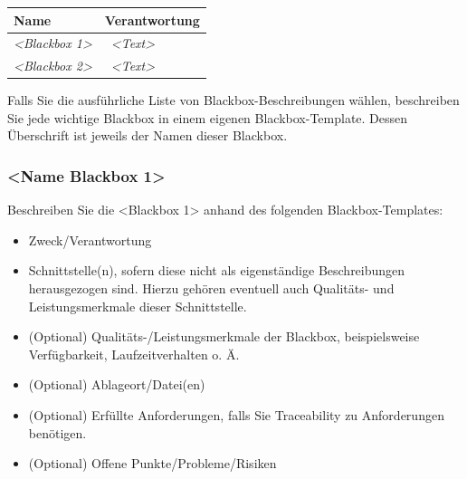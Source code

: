 \documentclass[]{article}
\begin{document}
\begin{longtable}[]{@{}ll@{}}
\toprule
\begin{minipage}[b]{0.31\columnwidth}\raggedright
\textbf{Name}\strut
\end{minipage} & \begin{minipage}[b]{0.63\columnwidth}\raggedright
\textbf{Verantwortung}\strut
\end{minipage}\tabularnewline
\midrule
\endhead
\begin{minipage}[t]{0.31\columnwidth}\raggedright
\emph{\textless{}Blackbox 1\textgreater{}}\strut
\end{minipage} & \begin{minipage}[t]{0.63\columnwidth}\raggedright
~\emph{\textless{}Text\textgreater{}}\strut
\end{minipage}\tabularnewline
\begin{minipage}[t]{0.31\columnwidth}\raggedright
\emph{\textless{}Blackbox 2\textgreater{}}\strut
\end{minipage} & \begin{minipage}[t]{0.63\columnwidth}\raggedright
~\emph{\textless{}Text\textgreater{}}\strut
\end{minipage}\tabularnewline
\bottomrule
\end{longtable}

Falls Sie die ausführliche Liste von Blackbox-Beschreibungen wählen,
beschreiben Sie jede wichtige Blackbox in einem eigenen
Blackbox-Template. Dessen Überschrift ist jeweils der Namen dieser
Blackbox.

\hypertarget{__name_blackbox_1}{%
\subsubsection{\textless{}Name Blackbox
1\textgreater{}}\label{__name_blackbox_1}}

Beschreiben Sie die \textless{}Blackbox 1\textgreater{} anhand des
folgenden Blackbox-Templates:

\begin{itemize}
\item
  Zweck/Verantwortung
\item
  Schnittstelle(n), sofern diese nicht als eigenständige Beschreibungen
  herausgezogen sind. Hierzu gehören eventuell auch Qualitäts- und
  Leistungsmerkmale dieser Schnittstelle.
\item
  (Optional) Qualitäts-/Leistungsmerkmale der Blackbox, beispielsweise
  Verfügbarkeit, Laufzeitverhalten o. Ä.
\item
  (Optional) Ablageort/Datei(en)
\item
  (Optional) Erfüllte Anforderungen, falls Sie Traceability zu
  Anforderungen benötigen.
\item
  (Optional) Offene Punkte/Probleme/Risiken
\end{itemize}
\end{document}
